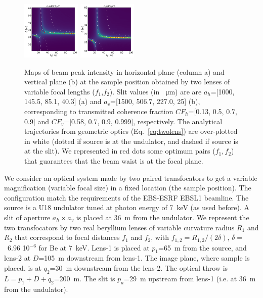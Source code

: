 \documentclass[9pt,twocolumn,twoside]{osajnl}
\begin{document}
\begin{figure}[htbp]
\includegraphics[width=0.25\textwidth]{figures/H_0.png}
\includegraphics[width=0.25\textwidth]{figures/V_0.png}
\caption{
        \label{fig:f1f2map}
    Maps of beam peak intensity in horizontal plane (column a) and vertical plane (b) at the sample position obtained by two lenses of variable focal lengths ($f_1$,$f_2$).
    Slit values (in \SI{}{\micro\meter}) are are $a_h$=[1000, 145.5, 85.1, 40.3] (a) and $a_v$=[1500, 506.7, 227.0, 25] (b), corresponding to transmitted coherence fraction
    $CF_h$=[0.13, 0.5, 0.7, 0.9] and
    $CF_v$=[0.58, 0.7, 0.9, 0.999], respectively.
    The analytical trajectories from geometric optics (Eq.~\ref{eq:twolens}) are over-plotted in white (dotted if source is at the undulator, and dashed if source is at the slit). We represented in red dots some optimum pairs ($f_1,f_2$) that guarantees that the beam waist is at the focal plane.
    }
\end{figure}


We consider an optical system made by two paired transfocators to get a variable magnification (variable focal size) in a fixed location (the sample position). The configuration match the requirements of the EBS-ESRF EBSL1 beamline. 
The source is a U18 undulator tuned at photon energy of \SI{7}{keV} (as used before). A slit of aperture $a_h \times a_v$ is placed at \SI{36}{\meter} from the undulator.  
We represent the two transfocators by two real beryllium lenses of variable curvature radius $R_1$ and $R_2$ that correspond to focal distances $f_1$ and $f_2$, with $f_{1,2}=R_{1,2}/(2 \delta)$, $\delta=$~6.96 10$^{-6}$ for Be at \SI{7}{keV}. Lens-1 is placed at $p_1$=\SI{65}{\meter} from the source, and lens-2 at $D$=\SI{105}{\meter} downstream from lens-1. The image plane, where sample is placed, is at $q_2$=\SI{30}{\meter} downstream from the lens-2. The optical throw is $L=p_1+D+q_2$=\SI{200}{\meter}. The slit is $p_a$=\SI{29}{\meter} upstream from lens-1 (i.e. at \SI{36}{\meter} from the undulator). 
\end{document}
